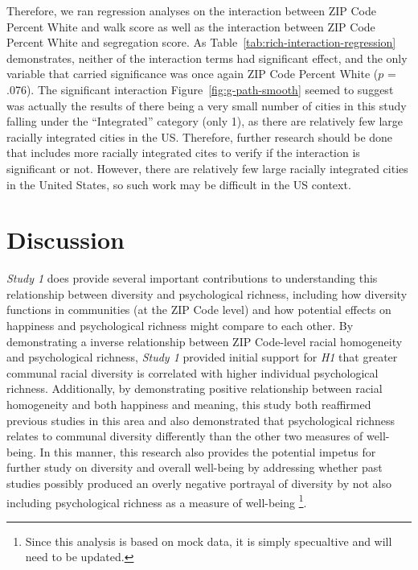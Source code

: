\documentclass[
  man,floatsintext]{apa7}
\begin{document}
Therefore, we ran regression analyses on the interaction between ZIP Code Percent White and walk score as well as the interaction between ZIP Code Percent White and segregation score. As Table~\ref{tab:rich-interaction-regression} demonstrates, neither of the interaction terms had significant effect, and the only variable that carried significance was once again ZIP Code Percent White (\(p\) = .076). The significant interaction Figure~\ref{fig:g-path-smooth} seemed to suggest was actually the results of there being a very small number of cities in this study falling under the ``Integrated'' category (only 1), as there are relatively few large racially integrated cities in the US. Therefore, further research should be done that includes more racially integrated cites to verify if the interaction is significant or not. However, there are relatively few large racially integrated cities in the United States, so such work may be difficult in the US context.

\hypertarget{discussion}{%
\section{Discussion}\label{discussion}}

\emph{Study 1} does provide several important contributions to understanding this relationship between diversity and psychological richness, including how diversity functions in communities (at the ZIP Code level) and how potential effects on happiness and psychological richness might compare to each other. By demonstrating a inverse relationship between ZIP Code-level racial homogeneity and psychological richness, \emph{Study 1} provided initial support for \emph{H1} that greater communal racial diversity is correlated with higher individual psychological richness. Additionally, by demonstrating positive relationship between racial homogeneity and both happiness and meaning, this study both reaffirmed previous studies in this area and also demonstrated that psychological richness relates to communal diversity differently than the other two measures of well-being. In this manner, this research also provides the potential impetus for further study on diversity and overall well-being by addressing whether past studies possibly produced an overly negative portrayal of diversity by not also including psychological richness as a measure of well-being \footnote{Since this analysis is based on mock data, it is simply specualtive and will need to be updated.}.
\end{document}
